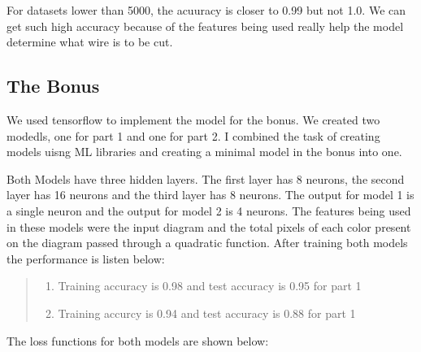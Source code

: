 \documentclass{article}
\begin{document}
\noindent For datasets lower than 5000, the acuuracy is closer to 0.99 but not 1.0. We can get such high accuracy because of the features being used really help the model determine what wire is to be cut.

\newpage
\subsection*{The Bonus}
We used tensorflow to implement the model for the bonus. We created two modedls, one for part 1 and one for part 2. I combined the task of creating models uisng ML libraries and creating a minimal model in the bonus into one.

\noindent Both Models have three hidden layers. The first layer has 8 neurons, the second layer has 16 neurons and the third layer has 8 neurons. The output for model 1 is a single neuron and the output for model 2 is 4 neurons. The features being used in these models were the input diagram and the total pixels of each color present on the diagram passed through a quadratic function. After training both models the performance is listen below:
\begin{quote}
    \begin{enumerate}
    \item Training accuracy  is 0.98 and test accuracy is 0.95 for part 1
    \item Training accurcy is 0.94 and test accuracy is 0.88 for part 1
    \end{enumerate}
    \end{quote}
The loss functions for both models are shown below:
\end{document}
